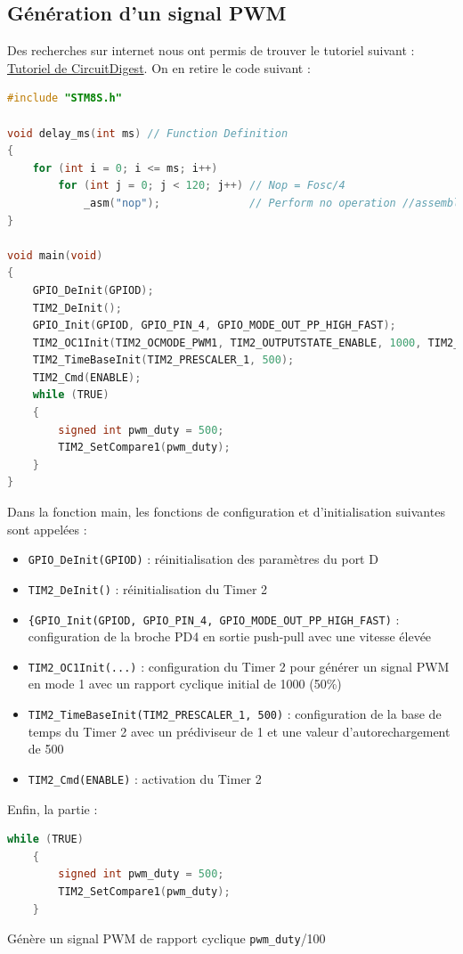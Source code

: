 \documentclass[11pt,a4paper]{article}
\begin{document}
\subsection{Génération d'un signal PWM}
Des recherches sur internet nous ont permis de trouver le tutoriel suivant : \href{https://circuitdigest.com/microcontroller-projects/pulse-width-modulation-pwm-with-stm8-using-cosmic-c-and-stvd}{Tutoriel de CircuitDigest}. On en retire le code suivant :

\begin{lstlisting}[language=C]
#include "STM8S.h"

void delay_ms(int ms) // Function Definition
{
    for (int i = 0; i <= ms; i++)
        for (int j = 0; j < 120; j++) // Nop = Fosc/4
            _asm("nop");              // Perform no operation //assembly code
}

void main(void)
{
    GPIO_DeInit(GPIOD);
    TIM2_DeInit();
    GPIO_Init(GPIOD, GPIO_PIN_4, GPIO_MODE_OUT_PP_HIGH_FAST);
    TIM2_OC1Init(TIM2_OCMODE_PWM1, TIM2_OUTPUTSTATE_ENABLE, 1000, TIM2_OCPOLARITY_HIGH);
    TIM2_TimeBaseInit(TIM2_PRESCALER_1, 500);
    TIM2_Cmd(ENABLE);
    while (TRUE)
    {
        signed int pwm_duty = 500;
        TIM2_SetCompare1(pwm_duty);
    }
}
\end{lstlisting}

Dans la fonction main, les fonctions de configuration et d'initialisation suivantes sont appelées :
\begin{itemize}
\item \lstinline$GPIO_DeInit(GPIOD)$ : réinitialisation des paramètres du port D
\item \lstinline$TIM2_DeInit()$ : réinitialisation du Timer 2
\item \lstinline${GPIO_Init(GPIOD, GPIO_PIN_4, GPIO_MODE_OUT_PP_HIGH_FAST)$ : configuration de la broche PD4 en sortie push-pull avec une vitesse élevée
\item \lstinline$TIM2_OC1Init(...)$ : configuration du Timer 2 pour générer un signal PWM en mode 1 avec un rapport cyclique initial de 1000 (50\%)
\item \lstinline$TIM2_TimeBaseInit(TIM2_PRESCALER_1, 500)$ : configuration de la base de temps du Timer 2 avec un prédiviseur de 1 et une valeur d'autorechargement de 500
\item \lstinline$TIM2_Cmd(ENABLE)$ : activation du Timer 2
\end{itemize}

Enfin, la partie :
\begin{lstlisting}[language=C]
while (TRUE)
    {
        signed int pwm_duty = 500;
        TIM2_SetCompare1(pwm_duty);
    }
\end{lstlisting}
Génère un signal PWM de rapport cyclique \lstinline$pwm_duty$/100
\end{document}
